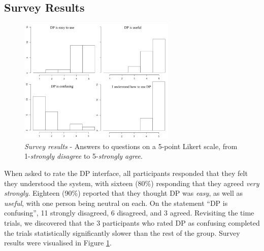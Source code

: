 \documentclass{sigchi}
\begin{document}

\subsection{Survey Results}

\begin{figure}[tbp]
\begin{center}
\includegraphics[width=7.5cm]{img/survey}
\caption{\emph{Survey results} - Answers to questions on a 5-point Likert scale, from 1-\emph{strongly disagree} to 5-\emph{strongly agree}.}
\label{fig:survey}
\end{center}
\end{figure}

When asked to rate the DP interface, all participants responded that they felt they understood the system, with sixteen (80\%) responding that they agreed \emph{very strongly}.  Eighteen (90\%) reported that they thought  DP was \emph{easy}, as well as \emph{useful}, with one person being neutral on each.  On the statement ``DP is confusing'',  11 strongly disagreed, 6 disagreed, and 3 agreed.  Revisiting the time trials, we discovered that the 3 participants who rated DP as confusing completed the trials statistically significantly slower than the rest of the group. Survey results were visualised in Figure \ref{fig:survey}.

\end{document}
